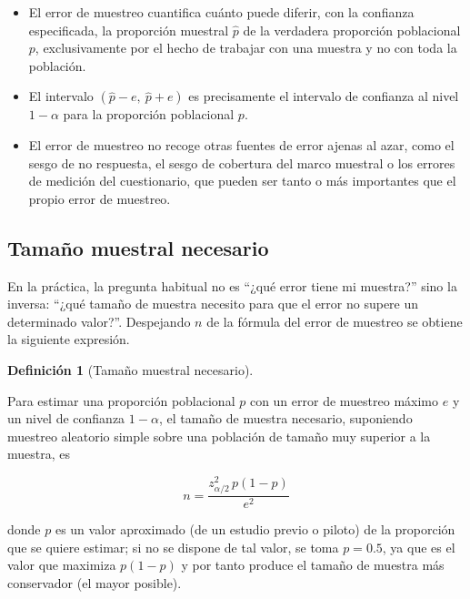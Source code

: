 \documentclass[
  spanish,
  a4paper,
]{scrreport}
\providecommand{\tightlist}{%
  \setlength{\itemsep}{0pt}\setlength{\parskip}{0pt}}
\theoremstyle{definition}
\theoremstyle{definition}
\newtheorem{definition}{Definición}[chapter]
\theoremstyle{remark}
\begin{document}
\begin{tcolorbox}[enhanced jigsaw, arc=.35mm, bottomrule=.15mm, bottomtitle=1mm, breakable, colback=white, colbacktitle=quarto-callout-note-color!10!white, colframe=quarto-callout-note-color-frame, coltitle=black, left=2mm, leftrule=.75mm, opacityback=0, opacitybacktitle=0.6, rightrule=.15mm, title=\textcolor{quarto-callout-note-color}{\faInfo}\hspace{0.5em}{Interpretación}, titlerule=0mm, toprule=.15mm, toptitle=1mm]

\begin{itemize}
\tightlist
\item
  El error de muestreo cuantifica cuánto puede diferir, con la confianza
  especificada, la proporción muestral \(\hat p\) de la verdadera
  proporción poblacional \(p\), exclusivamente por el hecho de trabajar
  con una muestra y no con toda la población.
\item
  El intervalo \((\hat p - e,\ \hat p + e)\) es precisamente el
  intervalo de confianza al nivel \(1-\alpha\) para la proporción
  poblacional \(p\).
\item
  El error de muestreo no recoge otras fuentes de error ajenas al azar,
  como el sesgo de no respuesta, el sesgo de cobertura del marco
  muestral o los errores de medición del cuestionario, que pueden ser
  tanto o más importantes que el propio error de muestreo.
\end{itemize}

\end{tcolorbox}

\subsection{Tamaño muestral
necesario}\label{tamauxf1o-muestral-necesario}

En la práctica, la pregunta habitual no es ``¿qué error tiene mi
muestra?'' sino la inversa: ``¿qué tamaño de muestra necesito para que
el error no supere un determinado valor?''. Despejando \(n\) de la
fórmula del error de muestreo se obtiene la siguiente expresión.

\begin{definition}[Tamaño muestral
necesario]\protect\hypertarget{def-encuestas-tamano-muestral}{}\label{def-encuestas-tamano-muestral}

Para estimar una proporción poblacional \(p\) con un error de muestreo
máximo \(e\) y un nivel de confianza \(1-\alpha\), el tamaño de muestra
necesario, suponiendo muestreo aleatorio simple sobre una población de
tamaño muy superior a la muestra, es

\[n = \frac{z_{\alpha/2}^2\, p(1-p)}{e^2}\]

donde \(p\) es un valor aproximado (de un estudio previo o piloto) de la
proporción que se quiere estimar; si no se dispone de tal valor, se toma
\(p=0.5\), ya que es el valor que maximiza \(p(1-p)\) y por tanto
produce el tamaño de muestra más conservador (el mayor posible).

\end{definition}
\end{document}

